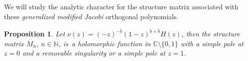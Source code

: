 \documentclass[12pt]{amsart}
\newtheorem{theorem}{Theorem}[section]
\newtheorem{proposition}{Proposition}[section]
\begin{document}
%


We will study the analytic character for the structure matrix associated with these \emph{generalized modified Jacobi} orthogonal polynomials.

\begin{proposition}
\label{teo:mnjacobi}
Let \(
\nu(z)=(-z)^{-\overline{b}}(1-z)^{b+\overline{b}} H (z)\), then the structure matrix \( M_n \),
 \( n\in\mathbb{N} \), is~a holomorphic function in \( \mathbb{C}\setminus
 \{0,1\}
 \) with a simple pole at \( z=0 \) and a removable singularity or a simple pole at \( z=1 \).
\end{proposition}
\end{document}
